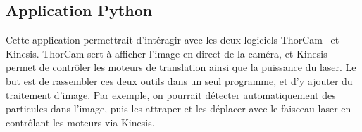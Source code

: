 \subsection{Application Python}

Cette application permettrait d'intéragir avec les deux logiciels ThorCam~\cite{thorcamSoftware} et Kinesis. ThorCam sert à afficher l'image en direct de la caméra, et Kinesis permet de contrôler les moteurs de translation ainsi que la puissance du laser. Le but est de rassembler ces deux outils dans un seul programme, et d'y ajouter du traitement d'image. Par exemple, on pourrait détecter automatiquement des particules dans l'image, puis les attraper et les déplacer avec le faisceau laser en contrôlant les moteurs via Kinesis.





